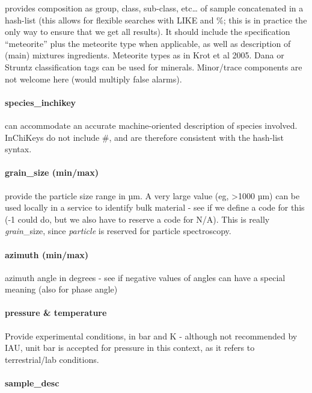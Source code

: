 \documentclass[11pt,a4paper]{ivoa}
\begin{document}
provides composition as group, class, sub-class, etc… of sample concatenated in a hash-list (this allows for flexible searches with LIKE and \%; this is in practice the only way to ensure that we get all results). It should include the specification ``meteorite'' plus the meteorite type when applicable, as well as description of (main) mixtures ingredients. Meteorite types as in Krot et al 2005. Dana or Struntz classification tags can be used for minerals. Minor/trace components are not welcome here (would multiply false alarms).

\paragraph{\textbf{species\_inchikey} }

can accommodate an accurate machine-oriented description of species involved. InChiKeys do not include \#, and are therefore consistent with the hash-list syntax.

\paragraph{grain\_size (min/max)}

provide the particle size range in µm. A very large value (eg, >1000 µm) can be used locally in a service to identify bulk material - see if we define a code for this (-1 could do, but we also have to reserve a code for N/A). This is really \emph{grain}\_size, since \emph{particle} is reserved for particle spectroscopy.\\

\paragraph{azimuth (min/max)}

azimuth angle in degrees - see if negative values of angles can have a special meaning (also for phase angle)

\paragraph{pressure \& temperature}

Provide experimental conditions, in bar and K - although not recommended by IAU, unit bar is accepted for pressure in this context, as it refers to terrestrial/lab conditions.

\paragraph{sample\_desc}
\end{document}
